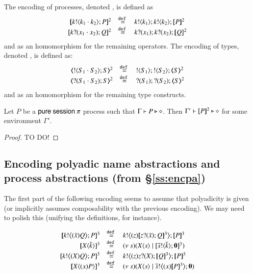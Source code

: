 \begin{definition}
The encoding of processes, denoted , is defined as
\[
	\begin{array}{rcl}
		\pmap{\bout{k}{k_1 \cat k_2} P}{2}	&\defeq&	\bout{k}{k_1} \bout{k}{k_2} \pmap{P}{2}\\
		\pmap{\binp{k}{x_1 \cat x_2} Q}{2}	&\defeq&	\binp{k}{x_1} \binp{k}{x_2} \pmap{Q}{2}\\
	\end{array}
\]
and as an homomorphism for the remaining operators. 
The encoding of types, denoted , is defined as:
\[
	\begin{array}{rcl}
		\tmap{\btout{S_1\cdot S_2} {S} }{2}	&\defeq&	\btout{S_1} \btout{S_2} \tmap{S}{2}  \\
		\tmap{\btinp{S_1\cdot S_2} S }{2}	&\defeq&	\btinp{S_1} \btinp{S_2} \tmap{S}{2}
	\end{array}
\]
and as an homomorphism for the remaining type constructs.
\end{definition}

\begin{proposition}
	Let $P$ be a $\mathsf{pure\ session\ }\pi$ process  such that  $\Gamma \vdash P \triangleright \diamond$. 
	Then $\Gamma' \vdash [\!\![P]\!\!]^2 \triangleright \diamond$
	for some environment $\Gamma'$.
\end{proposition}

\begin{proof} TO DO!
\end{proof}

\subsection{Encoding polyadic name abstractions and process abstractions (from \S\ref{ss:encpa})}


The first part of the following encoding seems to assume that polyadicity is given (or implicitly assumes composability with the previous encoding).
We may need to polish this (unifying the definitions, for instance).

\begin{definition}
\[
	\begin{array}{rcl}
		\pmap{\bbout{k}{\abs{\tilde{x}}{Q}} P}{3}	&\defeq&	\bbout{k}{ \abs{z}{ \pmap{ \binp{z}{\tilde{x}} Q}{3} } } \pmap{P}{3}\\
		\pmap{\appl{\X}{\tilde{k}}}{3}			&\defeq&	\newsp{s}{\appl{\X}{s} \Par \pmap{\bout{\dual{s}}{\tilde{k}} \inact}{3} }\\
		\pmap{\bbout{k}{\abs{\X} Q} P}{3}	&\defeq&	\bbout{k}{\abs{z} \binp{z}{\X} \pmap{Q}{3}} \pmap{P}{3}\\
		\pmap{\appl{X}{\abs{x} P}}{3}	&\defeq&	\newsp{s}{\appl{X}{s} \Par \bbout{\dual{s}}{\abs{x}{\pmap{P}{3}}} \inact}	
		\end{array}
\]
\end{definition}

